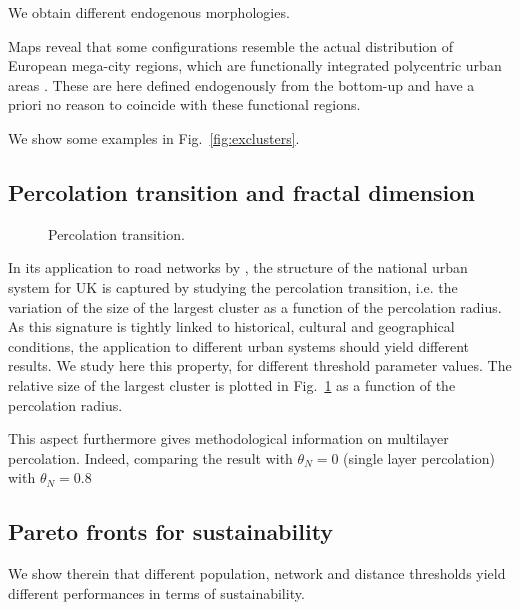 \documentclass{jimis-en}
\begin{document}
We obtain different endogenous morphologies.

Maps reveal that some configurations resemble the actual distribution of European mega-city regions, which are functionally integrated polycentric urban areas \citep{hall2006polycentric}. These are here defined endogenously from the bottom-up and have a priori no reason to coincide with these functional regions.

We show some examples in Fig.~\ref{fig:exclusters}.




\subsection{Percolation transition and fractal dimension}


\begin{figure}[ht] 
  \centering
  \label{fig:percolation}
  \caption{Percolation transition.}
\end{figure}


In its application to road networks by \cite{arcaute2016cities}, the structure of the national urban system for UK is captured by studying the percolation transition, i.e. the variation of the size of the largest cluster as a function of the percolation radius. As this signature is tightly linked to historical, cultural and geographical conditions, the application to different urban systems should yield different results. We study here this property, for different threshold parameter values. The relative size of the largest cluster is plotted in Fig.~\ref{fig:percolation} as a function of the percolation radius.

This aspect furthermore gives methodological information on multilayer percolation. Indeed, comparing the result with $\theta_N = 0$ (single layer percolation) with $\theta_N = 0.8$





\subsection{Pareto fronts for sustainability}


We show therein that different population, network and distance thresholds yield different performances in terms of sustainability.


\end{document}
